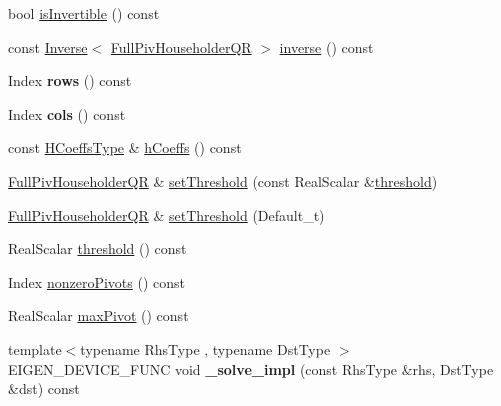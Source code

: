 \begin{DoxyCompactItemize}
bool \mbox{\hyperlink{class_eigen_1_1_full_piv_householder_q_r_aeb1d779ec22ec68a5a28d4235db02ec1}{is\+Invertible}} () const
\item 
const \mbox{\hyperlink{class_eigen_1_1_inverse}{Inverse}}$<$ \mbox{\hyperlink{class_eigen_1_1_full_piv_householder_q_r}{Full\+Piv\+Householder\+QR}} $>$ \mbox{\hyperlink{class_eigen_1_1_full_piv_householder_q_r_a352ce66397af06da214ddde343cec6f5}{inverse}} () const
\item 
\mbox{\label{class_eigen_1_1_full_piv_householder_q_r_a3b3fd394100b72f5979060b34b94ff01}} 
Index {\bfseries rows} () const
\item 
\mbox{\label{class_eigen_1_1_full_piv_householder_q_r_a1849e6c9ba23dfeeaa00f2480d43f826}} 
Index {\bfseries cols} () const
\item 
const \mbox{\hyperlink{struct_eigen_1_1internal_1_1true__type}{H\+Coeffs\+Type}} \& \mbox{\hyperlink{class_eigen_1_1_full_piv_householder_q_r_a874fcd822871010f7961d9e94f1767e4}{h\+Coeffs}} () const
\item 
\mbox{\hyperlink{class_eigen_1_1_full_piv_householder_q_r}{Full\+Piv\+Householder\+QR}} \& \mbox{\hyperlink{class_eigen_1_1_full_piv_householder_q_r_a92277e572bf98245891015d12dd2b602}{set\+Threshold}} (const Real\+Scalar \&\mbox{\hyperlink{class_eigen_1_1_full_piv_householder_q_r_af7f6ac15ca19c2b9e45dc3eaae58c201}{threshold}})
\item 
\mbox{\hyperlink{class_eigen_1_1_full_piv_householder_q_r}{Full\+Piv\+Householder\+QR}} \& \mbox{\hyperlink{class_eigen_1_1_full_piv_householder_q_r_aaea4bf3dd145e0cddb16e364cca9d887}{set\+Threshold}} (Default\+\_\+t)
\item 
Real\+Scalar \mbox{\hyperlink{class_eigen_1_1_full_piv_householder_q_r_af7f6ac15ca19c2b9e45dc3eaae58c201}{threshold}} () const
\item 
Index \mbox{\hyperlink{class_eigen_1_1_full_piv_householder_q_r_af1e4d04824084a964c1a6e51db68376f}{nonzero\+Pivots}} () const
\item 
Real\+Scalar \mbox{\hyperlink{class_eigen_1_1_full_piv_householder_q_r_a7887506237a3bf912aebc9aaa8edacec}{max\+Pivot}} () const
\item 
\mbox{\label{class_eigen_1_1_full_piv_householder_q_r_ada7941201fde2fd566f8d6050fea6c2e}} 
{\footnotesize template$<$typename Rhs\+Type , typename Dst\+Type $>$ }\\E\+I\+G\+E\+N\+\_\+\+D\+E\+V\+I\+C\+E\+\_\+\+F\+U\+NC void {\bfseries \+\_\+solve\+\_\+impl} (const Rhs\+Type \&rhs, Dst\+Type \&dst) const

\end{DoxyCompactItemize}

